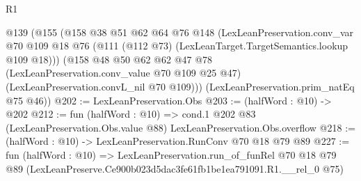 \begin{lexlean}{R1}
\begin{coremodule}
  @139
    (@155
      (@158
        @38
        @51
        @62
        @64
        @76
        @148
        (LexLeanPreservation.conv_var
          @70
          @109
          @18
          @76
          (@111 (@112 @73) (LexLeanTarget.TargetSemantics.lookup @109 @18)))
        (@158
          @48
          @50
          @62
          @62
          @47
          @78
          (LexLeanPreservation.conv_value @70 @109 @25 @47)
          (LexLeanPreservation.convL_nil @70 @109)))
      (LexLeanPreservation.prim_natEq @75 @46))
@202 := LexLeanPreservation.Obs
@203 := (halfWord : @10) -> @202
@212 := fun (halfWord : @10) =>
  cond.{1} @202 @83 (LexLeanPreservation.Obs.value @88) LexLeanPreservation.Obs.overflow
@218 := (halfWord : @10) -> LexLeanPreservation.RunConv @70 @18 @79 @89
@227 := fun (halfWord : @10) =>
  LexLeanPreservation.run_of_funRel
    @70
    @18
    @79
    @89
    (LexLeanPreserve.Ce900b023d5dac3fe61fb1be1ea791091.R1.__rel_0 @75)
\end{coremodule}
\end{lexlean}
